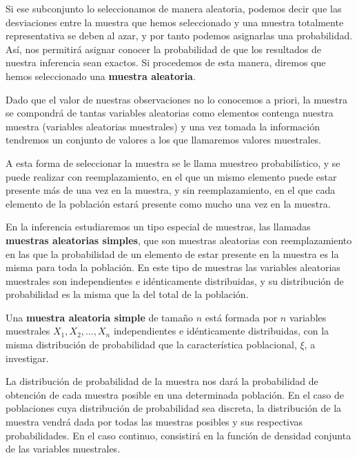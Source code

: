 Si ese subconjunto lo seleccionamos de manera aleatoria, podemos decir que las desviaciones entre la muestra que hemos seleccionado y una muestra totalmente representativa se deben al azar, y por tanto podemos asignarlas una probabilidad. As\'i, nos permitir\'a asignar conocer la probabilidad de que los resultados de nuestra inferencia sean exactos. Si procedemos de esta manera, diremos que hemos seleccionado una \textbf{muestra aleatoria}.

Dado que el valor de nuestras observaciones no lo conocemos a priori, la muestra se compondr\'a de tantas variables aleatorias como elementos contenga nuestra muestra (variables aleatorias muestrales) y una vez tomada la informaci\'on tendremos un conjunto de valores a los que llamaremos valores muestrales.

A esta forma de seleccionar la muestra se le llama muestreo probabil\'istico, y se puede realizar con reemplazamiento, en el que un mismo elemento puede estar presente m\'as de una vez en la muestra, y sin reemplazamiento, en el que cada elemento de la poblaci\'on estar\'a presente como mucho una vez en la muestra.

En la inferencia estudiaremos un tipo especial de muestras, las llamadas \textbf{muestras aleatorias simples}, que son muestras aleatorias con reemplazamiento en las que la probabilidad de un elemento de estar presente en la muestra es la misma para toda la poblaci\'on. En este tipo de muestras las variables aleatorias muestrales son independientes e id\'enticamente distribuidas, y su distribuci\'on de probabilidad es la misma que la del total de la poblaci\'on.

\begin{definicion}
Una \textbf{muestra aleatoria simple} de tama\~no $n$ est\'a formada por $n$ variables muestrales $X_1, X_2,\ldots, X_n$ independientes e id\'enticamente distribuidas, con la misma distribuci\'on de probabilidad que la caracter\'istica poblacional, $\xi$, a investigar.
\end{definicion}


La distribuci\'on de probabilidad de la muestra nos dar\'a la probabilidad de obtenci\'on de cada muestra posible en una determinada poblaci\'on. En el caso de poblaciones cuya distribuci\'on de probabilidad sea discreta, la distribuci\'on de la muestra vendr\'a dada por todas las muestras posibles y sus respectivas probabilidades. En el caso continuo, consistir\'a en la funci\'on de densidad conjunta de las variables muestrales.


